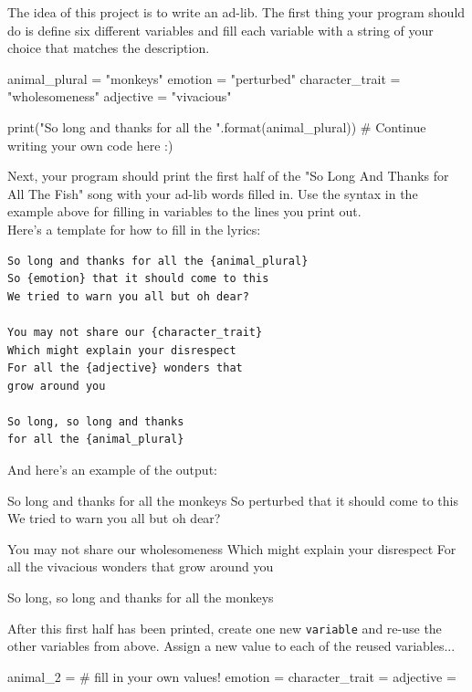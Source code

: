 \documentclass{42-en}
\begin{document}
The idea of this project is to write an ad-lib. The first thing your program should do is define six different variables and fill each variable with a string of your choice that matches the description.

\begin{42pycode}
animal_plural = "monkeys"
emotion = "perturbed"
character_trait = "wholesomeness"
adjective = "vivacious"

print("So long and thanks for all the {}".format(animal_plural))
# Continue writing your own code here :)
\end{42pycode}

Next, your program should print the first half of the "So Long And Thanks for All The Fish" song with your ad-lib words filled in. Use the syntax in the example above for filling in variables to the lines you print out.\\

Here's a template for how to fill in the lyrics:

\begin{verbatim}
So long and thanks for all the {animal_plural}
So {emotion} that it should come to this
We tried to warn you all but oh dear?

You may not share our {character_trait}
Which might explain your disrespect
For all the {adjective} wonders that
grow around you

So long, so long and thanks
for all the {animal_plural}
\end{verbatim}


And here's an example of the output:

\begin{42console}
So long and thanks for all the monkeys
So perturbed that it should come to this
We tried to warn you all but oh dear?

You may not share our wholesomeness
Which might explain your disrespect
For all the vivacious wonders that
grow around you

So long, so long and thanks
for all the monkeys
\end{42console}


After this first half has been printed, create one new \texttt{variable} and re-use the other variables from above. Assign a new value to each of the reused variables...\\
\begin{42pycode}
animal_2 = # fill in your own values!
emotion = 
character_trait = 
adjective = 
\end{42pycode}
\end{document}
